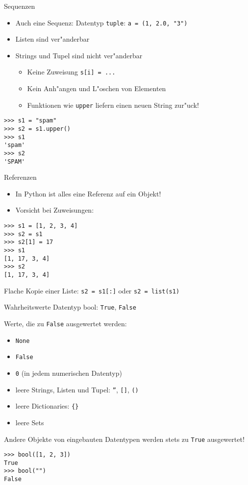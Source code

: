 \begin{frame}[fragile]{Sequenzen}
\begin{itemize}
\item Auch eine Sequenz: Datentyp \alert{\texttt{tuple}}: \lstinline{a = (1, 2.0, "3")}
\item Listen sind ver"anderbar
\item Strings und Tupel sind nicht ver"anderbar
\begin{itemize}
\item Keine Zuweisung \lstinline{s[i] = ...}
\item Kein Anh"angen und L"oschen von Elementen
\item Funktionen wie \texttt{upper} liefern einen neuen String zur"uck!
\end{itemize}
\end{itemize}
\begin{lstlisting}[style=Shell]
>>> s1 = "spam"
>>> s2 = s1.upper()
>>> s1
'spam'
>>> s2
'SPAM'
\end{lstlisting}
\end{frame}

\begin{frame}[fragile]{Referenzen}
\begin{itemize}
\item In Python ist alles eine Referenz auf ein Objekt!
\item Vorsicht bei Zuweisungen:
\end{itemize}
\begin{lstlisting}[style=Shell]
>>> s1 = [1, 2, 3, 4]
>>> s2 = s1
>>> s2[1] = 17
>>> s1
[1, 17, 3, 4]
>>> s2
[1, 17, 3, 4]
\end{lstlisting}
Flache Kopie einer Liste: \lstinline{s2 = s1[:]} oder \lstinline{s2 = list(s1)}
\end{frame}

\begin{frame}[fragile]{Wahrheitswerte}
Datentyp \alert{bool}: \texttt{True}, \texttt{False}

Werte, die zu \texttt{False} ausgewertet werden:
\begin{itemize}
\item \texttt{None}
\item \texttt{False}
\item \texttt{0} (in jedem numerischen Datentyp)
\item leere Strings, Listen und Tupel: \texttt{''}, \texttt{[]}, \texttt{()}
\item leere Dictionaries: \texttt{\{\}}
\item leere Sets
\end{itemize}
Andere Objekte von eingebauten Datentypen werden stets zu \texttt{True} ausgewertet!
\begin{lstlisting}[style=Shell]
>>> bool([1, 2, 3])
True
>>> bool("")
False
\end{lstlisting}
\end{frame}

